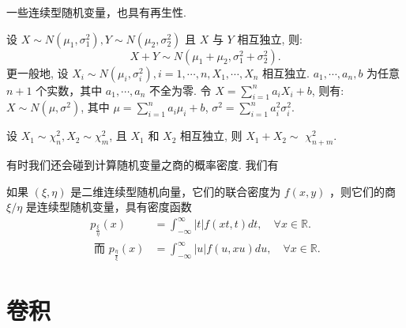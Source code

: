 一些连续型随机变量，也具有再生性.
\begin{example}
    设 $X \sim N\left(\mu_1, \sigma_1^2\right), Y \sim N\left(\mu_2, \sigma_2^2\right)$ 且 $X$ 与 $Y$ 相互独立, 则:
    $$
        X+Y \sim N\left(\mu_1+\mu_2, \sigma_1^2+\sigma_2^2\right) .
    $$
    更一般地, 设 $X_i \sim N\left(\mu_i, \sigma_i^2\right), i=1, \cdots, n, X_1, \cdots, X_n$ 相互独立. $a_1, \cdots, a_n, b$ 为任意 $n+1$ 个实数，其中 $a_1, \cdots, a_n$ 不全为零. 令 $X=\sum_{i=1}^n a_i X_i+b$, 则有: $X \sim N\left(\mu, \sigma^2\right)$, 其中 $\mu=\sum_{i=1}^n a_i \mu_i+b$, $\sigma^2=\sum_{i=1}^n a_i^2 \sigma_i^2$.
\end{example}
\begin{example}
    设 $X_1 \sim \chi_n^2, X_2 \sim \chi_m^2$, 且 $X_1$ 和 $X_2$ 相互独立, 则 $X_1+X_2 \sim$ $\chi_{n+m}^2$.
\end{example}
有时我们还会碰到计算随机变量之商的概率密度. 我们有
\begin{theorem}
    如果 $(\xi, \eta)$ 是二维连续型随机向量，它们的联合密度为 $f(x, y)$ ，则它们的商 $\xi / \eta$ 是连续型随机变量，具有密度函数
    $$
        \begin{aligned}
            p_{\frac{\xi}{\eta}}(x)             & =\int_{-\infty}^{\infty}|t| f(x t, t) d t, \quad \forall x \in \mathbb{R} . \\
            \text { 而 } p_{\frac{\eta}{\xi}}(x) & =\int_{-\infty}^{\infty}|u| f(u, x u) d u, \quad \forall x \in \mathbb{R} .
        \end{aligned}
    $$
\end{theorem}



\section{卷积}

